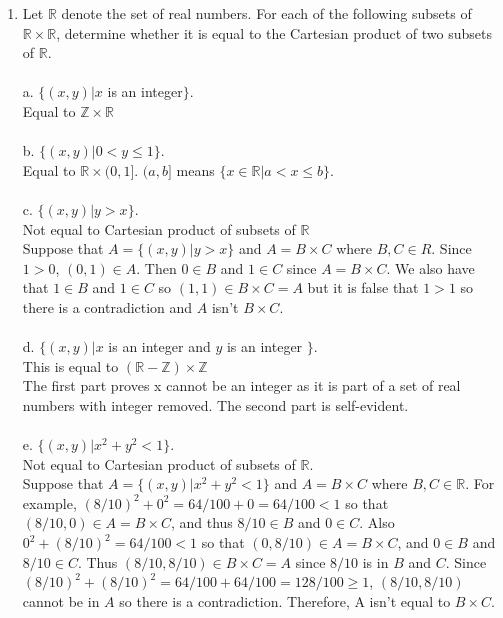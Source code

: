 \documentclass[]{article}
\begin{document}
\begin{enumerate}
    \item Let $\mathbb{R}$ denote the set of real numbers. For each of the following subsets of $\mathbb{R} \times \mathbb{R}$, determine whether it is equal to the Cartesian product of two subsets of $\mathbb{R}$.
    \\\\a. $\{(x,y)|x$ is an integer$\}$.
    \\ Equal to $\mathbb{Z} \times \mathbb{R}$
    \\\\b. $\{(x,y)|0<y \leq 1 \}$.
    \\ Equal to $\mathbb{R} \times (0,1]$. $(a,b]$ means $\{x \in \mathbb{R}|a<x \leq b\}$.
    \\\\c. $\{(x,y)|y>x\}$.
    \\Not equal to Cartesian product of subsets of $\mathbb{R}$
    \\Suppose that $A = \{ (x,y) | y>x \}$ and $A=B \times C$ where $B, C \in R$. Since $1>0$, $(0,1) \in A$. Then $0 \in B$ and $1 \in C$ since $A = B \times C$. We also have that $1 \in B$ and $1 \in C$ so $(1,1) \in B \times C=A$ but it is false that $1>1$ so there is a contradiction and $A$ isn't $B \times C$.
    \\\\d. $\{(x,y)|x$ is an integer and $y$ is an integer $\}$.
    \\ This is equal to $(\mathbb{R}-\mathbb{Z}) \times \mathbb{Z}$
    \\ The first part proves x cannot be an integer as it is part of a set of real numbers with integer removed. The second part is self-evident.
    \\\\e. $\{(x,y)|x^2+y^2<1\}$.
    \\Not equal to Cartesian product of subsets of $\mathbb{R}$.
        \\Suppose that $A = \{ (x,y) | x^2+y^2<1 \}$ and $A=B \times C$ where $B,C \in \mathbb{R}$. For example, $(8/10)^2+0^2=64/100+0=64/100<1$ so that $(8/10,0) \in A = B \times C$, and thus $8/10 \in B$ and $0 \in C$. Also $0^2 + (8/10)^2 = 64/100<1$ so that $(0, 8/10) \in A=B \times C$, and $0 \in B$ and $8/10 \in C$. Thus $(8/10,8/10) \in B \times C = A$ since $8/10$ is in $B$ and $C$. Since $(8/10)^2+(8/10)^2=64/100 + 64/100 = 128/100 \geq 1$, $(8/10,8/10)$ cannot be in $A$ so there is a contradiction. Therefore, A isn't equal to $B \times C$.
\end{enumerate}
\end{document}
